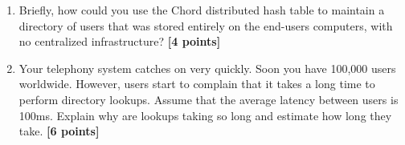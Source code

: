 \documentclass{article}
\begin{document}
\begin{enumerate}
\item{Briefly, how could you use the Chord distributed hash table to
maintain a directory of users that was stored entirely on the end-users
computers, with no centralized infrastructure? \textbf{[4 points]}}

\item{Your telephony system catches on very quickly. Soon you have 100,000
users worldwide. However, users start to complain that it takes a long time to
perform directory lookups. Assume that the average latency between users is
100ms. Explain why are lookups taking so long and estimate how long they take.
\textbf{[6 points]}}

\end{enumerate}	
\end{document}
